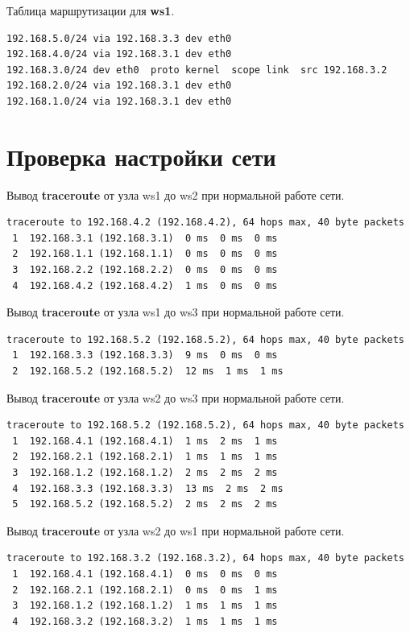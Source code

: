 \documentclass[a4paper,12pt]{article}
\begin{document}
Таблица маршрутизации для \textbf{ws1}.

\begin{Verbatim}
192.168.5.0/24 via 192.168.3.3 dev eth0 
192.168.4.0/24 via 192.168.3.1 dev eth0 
192.168.3.0/24 dev eth0  proto kernel  scope link  src 192.168.3.2 
192.168.2.0/24 via 192.168.3.1 dev eth0 
192.168.1.0/24 via 192.168.3.1 dev eth0
\end{Verbatim}




\section{Проверка настройки сети}

Вывод \textbf{traceroute} от узла ws1 до ws2 при нормальной работе сети.

\begin{Verbatim}
traceroute to 192.168.4.2 (192.168.4.2), 64 hops max, 40 byte packets
 1  192.168.3.1 (192.168.3.1)  0 ms  0 ms  0 ms
 2  192.168.1.1 (192.168.1.1)  0 ms  0 ms  0 ms
 3  192.168.2.2 (192.168.2.2)  0 ms  0 ms  0 ms
 4  192.168.4.2 (192.168.4.2)  1 ms  0 ms  0 ms
\end{Verbatim}

Вывод \textbf{traceroute} от узла ws1 до ws3 при нормальной работе сети.

\begin{Verbatim}
traceroute to 192.168.5.2 (192.168.5.2), 64 hops max, 40 byte packets
 1  192.168.3.3 (192.168.3.3)  9 ms  0 ms  0 ms
 2  192.168.5.2 (192.168.5.2)  12 ms  1 ms  1 ms
\end{Verbatim}

Вывод \textbf{traceroute} от узла ws2 до ws3 при нормальной работе сети.

\begin{Verbatim}
traceroute to 192.168.5.2 (192.168.5.2), 64 hops max, 40 byte packets
 1  192.168.4.1 (192.168.4.1)  1 ms  2 ms  1 ms
 2  192.168.2.1 (192.168.2.1)  1 ms  1 ms  1 ms
 3  192.168.1.2 (192.168.1.2)  2 ms  2 ms  2 ms
 4  192.168.3.3 (192.168.3.3)  13 ms  2 ms  2 ms
 5  192.168.5.2 (192.168.5.2)  2 ms  2 ms  2 ms
\end{Verbatim}

Вывод \textbf{traceroute} от узла ws2 до ws1 при нормальной работе сети.

\begin{Verbatim}
traceroute to 192.168.3.2 (192.168.3.2), 64 hops max, 40 byte packets
 1  192.168.4.1 (192.168.4.1)  0 ms  0 ms  0 ms
 2  192.168.2.1 (192.168.2.1)  0 ms  0 ms  1 ms
 3  192.168.1.2 (192.168.1.2)  1 ms  1 ms  1 ms
 4  192.168.3.2 (192.168.3.2)  1 ms  1 ms  1 ms
\end{Verbatim}
\end{document}
